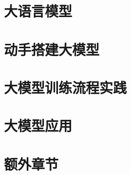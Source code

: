 \documentclass[12pt,a4paper]{book}
\begin{document}
\chapter{大语言模型}


\chapter{动手搭建大模型}


\chapter{大模型训练流程实践}


\chapter{大模型应用}


\appendix
\chapter{额外章节}

\end{document}
